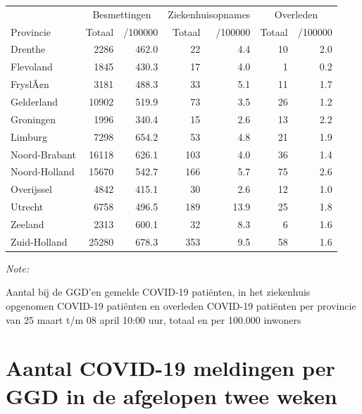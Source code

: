 \documentclass[
  english,
  man,floatsintext]{apa6}
\begin{document}
\begin{table}
\centering
\begin{threeparttable}
\begin{tabular}{lrrrrrr}
\toprule
\multicolumn{1}{c}{ } & \multicolumn{2}{c}{Besmettingen} & \multicolumn{2}{c}{Ziekenhuisopnames} & \multicolumn{2}{c}{Overleden} \\
\cmidrule(l{3pt}r{3pt}){2-3} \cmidrule(l{3pt}r{3pt}){4-5} \cmidrule(l{3pt}r{3pt}){6-7}
Provincie & Totaal & /100000 & Totaal & /100000 & Totaal & /100000\\
\midrule
Drenthe & 2286 & 462.0 & 22 & 4.4 & 10 & 2.0\\
Flevoland & 1845 & 430.3 & 17 & 4.0 & 1 & 0.2\\
FryslÃ¢n & 3181 & 488.3 & 33 & 5.1 & 11 & 1.7\\
Gelderland & 10902 & 519.9 & 73 & 3.5 & 26 & 1.2\\
Groningen & 1996 & 340.4 & 15 & 2.6 & 13 & 2.2\\
Limburg & 7298 & 654.2 & 53 & 4.8 & 21 & 1.9\\
Noord-Brabant & 16118 & 626.1 & 103 & 4.0 & 36 & 1.4\\
Noord-Holland & 15670 & 542.7 & 166 & 5.7 & 75 & 2.6\\
Overijssel & 4842 & 415.1 & 30 & 2.6 & 12 & 1.0\\
Utrecht & 6758 & 496.5 & 189 & 13.9 & 25 & 1.8\\
Zeeland & 2313 & 600.1 & 32 & 8.3 & 6 & 1.6\\
Zuid-Holland & 25280 & 678.3 & 353 & 9.5 & 58 & 1.6\\
\bottomrule
\end{tabular}
\begin{tablenotes}
\item \textit{Note: } 
\item Aantal bij de GGD’en gemelde COVID-19 patiënten, in het ziekenhuis opgenomen COVID-19 patiënten en overleden COVID-19 patiënten per provincie van 25 maart t/m 08 april 10:00 uur, totaal en per 100.000 inwoners
\end{tablenotes}
\end{threeparttable}
\end{table}

\newpage

\hypertarget{aantal-covid-19-meldingen-per-ggd-in-de-afgelopen-twee-weken}{%
\section{Aantal COVID-19 meldingen per GGD in de afgelopen twee weken}\label{aantal-covid-19-meldingen-per-ggd-in-de-afgelopen-twee-weken}}
\end{document}
